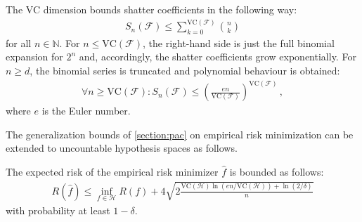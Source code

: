     \begin{property}\label{data:sauer_lemma}
        The VC dimension bounds shatter coefficients in the following way:
        \begin{gather}
            S_n(\mathcal{F})\leq\sum_{k=0}^{\mathrm{VC}(\mathcal{F})}\binom{n}{k}
        \end{gather}
        for all $n\in\mathbb{N}$. For $n\leq\mathrm{VC}(\mathcal{F})$, the right-hand side is just the full binomial expansion for $2^n$ and, accordingly, the shatter coefficients grow exponentially. For $n\geq d$, the binomial series is truncated and polynomial behaviour is obtained:
        \begin{gather}
            \forall n\geq\mathrm{VC}(\mathcal{F}):S_n(\mathcal{F})\leq\left(\frac{en}{\mathrm{VC}(\mathcal{F})}\right)^{\mathrm{VC}(\mathcal{F})}\,,
        \end{gather}
        where $e$ is the Euler number.
    \end{property}

    The generalization bounds of \cref{section:pac} on empirical risk minimization can be extended to uncountable hypothesis spaces as follows.
    \begin{property}
        The expected risk of the empirical risk minimizer $\widehat{f}$ is bounded as follows:
        \begin{gather}
            R(\widehat{f})\leq\inf_{f\in\mathcal{H}}R(f)+4\sqrt{2\frac{\mathrm{VC}(\mathcal{H})\ln(en/\mathrm{VC}(\mathcal{H})) + \ln(2/\delta)}{n}}
        \end{gather}
        with probability at least $1-\delta$.
    \end{property}

